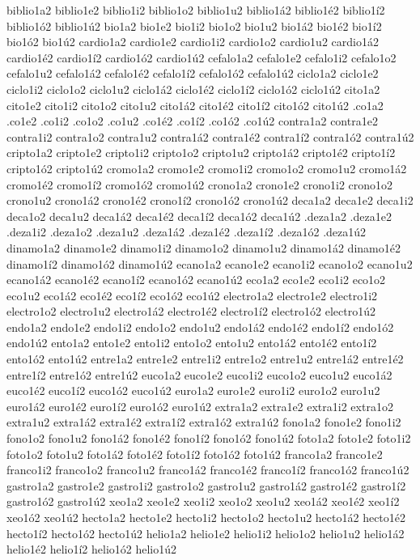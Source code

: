{biblio1a2 biblio1e2 biblio1i2 biblio1o2 biblio1u2 biblio1á2 biblio1é2 biblio1í2 biblio1ó2 biblio1ú2
bio1a2 bio1e2 bio1i2 bio1o2 bio1u2 bio1á2 bio1é2 bio1í2 bio1ó2 bio1ú2
cardio1a2 cardio1e2 cardio1i2 cardio1o2 cardio1u2 cardio1á2 cardio1é2 cardio1í2 cardio1ó2 cardio1ú2
cefalo1a2 cefalo1e2 cefalo1i2 cefalo1o2 cefalo1u2 cefalo1á2 cefalo1é2 cefalo1í2 cefalo1ó2 cefalo1ú2
ciclo1a2 ciclo1e2 ciclo1i2 ciclo1o2 ciclo1u2 ciclo1á2 ciclo1é2 ciclo1í2 ciclo1ó2 ciclo1ú2
cito1a2 cito1e2 cito1i2 cito1o2 cito1u2 cito1á2 cito1é2 cito1í2 cito1ó2 cito1ú2
.co1a2 .co1e2 .co1i2 .co1o2 .co1u2         .co1é2 .co1í2 .co1ó2 .co1ú2
contra1a2 contra1e2 contra1i2 contra1o2 contra1u2 contra1á2 contra1é2 contra1í2 contra1ó2 contra1ú2
cripto1a2 cripto1e2 cripto1i2 cripto1o2 cripto1u2 cripto1á2 cripto1é2 cripto1í2 cripto1ó2 cripto1ú2
cromo1a2 cromo1e2 cromo1i2 cromo1o2 cromo1u2 cromo1á2 cromo1é2 cromo1í2 cromo1ó2 cromo1ú2
crono1a2 crono1e2 crono1i2 crono1o2 crono1u2 crono1á2 crono1é2 crono1í2 crono1ó2 crono1ú2
deca1a2 deca1e2 deca1i2 deca1o2 deca1u2 deca1á2 deca1é2 deca1í2 deca1ó2 deca1ú2
.deza1a2 .deza1e2 .deza1i2 .deza1o2 .deza1u2 .deza1á2 .deza1é2 .deza1í2 .deza1ó2 .deza1ú2
dinamo1a2 dinamo1e2 dinamo1i2 dinamo1o2 dinamo1u2 dinamo1á2 dinamo1é2 dinamo1í2 dinamo1ó2 dinamo1ú2
ecano1a2 ecano1e2 ecano1i2 ecano1o2 ecano1u2 ecano1á2 ecano1é2 ecano1í2 ecano1ó2 ecano1ú2
eco1a2 eco1e2 eco1i2 eco1o2 eco1u2 eco1á2 eco1é2 eco1í2 eco1ó2 eco1ú2
electro1a2 electro1e2 electro1i2 electro1o2 electro1u2 electro1á2 electro1é2 electro1í2 electro1ó2 electro1ú2
endo1a2 endo1e2 endo1i2 endo1o2 endo1u2 endo1á2 endo1é2 endo1í2 endo1ó2 endo1ú2
ento1a2 ento1e2 ento1i2 ento1o2 ento1u2 ento1á2 ento1é2 ento1í2 ento1ó2 ento1ú2
entre1a2 entre1e2 entre1i2 entre1o2 entre1u2 entre1á2 entre1é2 entre1í2 entre1ó2 entre1ú2
euco1a2 euco1e2 euco1i2 euco1o2 euco1u2 euco1á2 euco1é2 euco1í2 euco1ó2 euco1ú2
euro1a2 euro1e2 euro1i2 euro1o2 euro1u2 euro1á2 euro1é2 euro1í2 euro1ó2 euro1ú2
extra1a2 extra1e2 extra1i2 extra1o2 extra1u2 extra1á2 extra1é2 extra1í2 extra1ó2 extra1ú2
fono1a2 fono1e2 fono1i2 fono1o2 fono1u2 fono1á2 fono1é2 fono1í2 fono1ó2 fono1ú2
foto1a2 foto1e2 foto1i2 foto1o2 foto1u2 foto1á2 foto1é2 foto1í2 foto1ó2 foto1ú2
franco1a2 franco1e2 franco1i2 franco1o2 franco1u2 franco1á2 franco1é2 franco1í2 franco1ó2 franco1ú2
gastro1a2 gastro1e2 gastro1i2 gastro1o2 gastro1u2 gastro1á2 gastro1é2 gastro1í2 gastro1ó2 gastro1ú2
xeo1a2 xeo1e2 xeo1i2 xeo1o2 xeo1u2 xeo1á2 xeo1é2 xeo1í2 xeo1ó2 xeo1ú2
hecto1a2 hecto1e2 hecto1i2 hecto1o2 hecto1u2 hecto1á2 hecto1é2 hecto1í2 hecto1ó2 hecto1ú2
helio1a2 helio1e2 helio1i2 helio1o2 helio1u2 helio1á2 helio1é2 helio1í2 helio1ó2 helio1ú2
}
